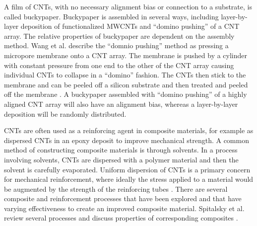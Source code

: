 A film of CNTs, with no necessary alignment bias or connection to a substrate, is called buckypaper.
Buckypaper is assembled in several ways, including layer-by-layer deposition of functionalized MWCNTs \cite{Lee2008} and ``domino pushing'' of a CNT array.
The relative properties of buckypaper are dependent on the assembly method.
Wang et al. describe the ``domnio pushing'' method as pressing a micropore membrane onto a CNT array.
The membrane is pushed by a cylinder with constant pressure from one end to the other of the CNT array causing individual CNTs to collapse in a ``domino'' fashion.
The CNTs then stick to the membrane and can be peeled off a silicon substrate and then treated and peeled off the membrane \cite{Wang2008}.
A buckypaper assembled with ``domino pushing'' of a highly aligned CNT array will also have an alignment bias, whereas a layer-by-layer deposition will be randomly distributed.

CNTs are often used as a reinforcing agent in composite materials, for example as dispersed CNTs in an epoxy deposit to improve mechanical strength.
A common method of constructing composite materials is through solvents.
In a process involving solvents, CNTs are dispersed with a polymer material and then the solvent is carefully evaporated.
Uniform dispersion of CNTs is a primary concern for mechanical reinforcement, where ideally the stress applied to a material would be augmented by the strength of the reinforcing tubes \cite{Coleman2006}.
There are several composite and reinforcement processes that have been explored and that have varying effectiveness to create an improved composite material.
Spitalsky et al. review several processes and discuss properties of corresponding composites \cite{Spitalsky2010}.

